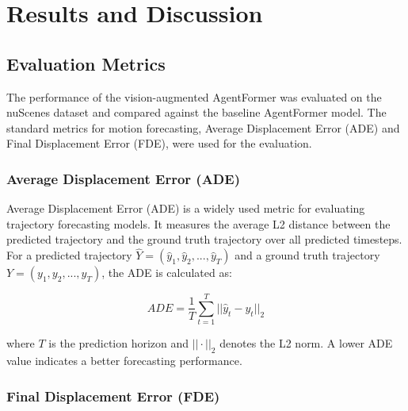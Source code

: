 
\chapter{Results and Discussion} %

\label{Chapter4} %


\section{Evaluation Metrics}

The performance of the vision-augmented AgentFormer was evaluated on the nuScenes dataset and compared against the baseline AgentFormer model. The standard metrics for motion forecasting, Average Displacement Error (ADE) and Final Displacement Error (FDE), were used for the evaluation.

\subsection{Average Displacement Error (ADE)}

Average Displacement Error (ADE) is a widely used metric for evaluating trajectory forecasting models. It measures the average L2 distance between the predicted trajectory and the ground truth trajectory over all predicted timesteps. For a predicted trajectory $\hat{Y} = (\hat{y}_1, \hat{y}_2, ..., \hat{y}_T)$ and a ground truth trajectory $Y = (y_1, y_2, ..., y_T)$, the ADE is calculated as:

\begin{equation}
ADE = \frac{1}{T} \sum_{t=1}^{T} ||\hat{y}_t - y_t||_2
\end{equation}

where $T$ is the prediction horizon and $||\cdot||_2$ denotes the L2 norm. A lower ADE value indicates a better forecasting performance.

\subsection{Final Displacement Error (FDE)}

